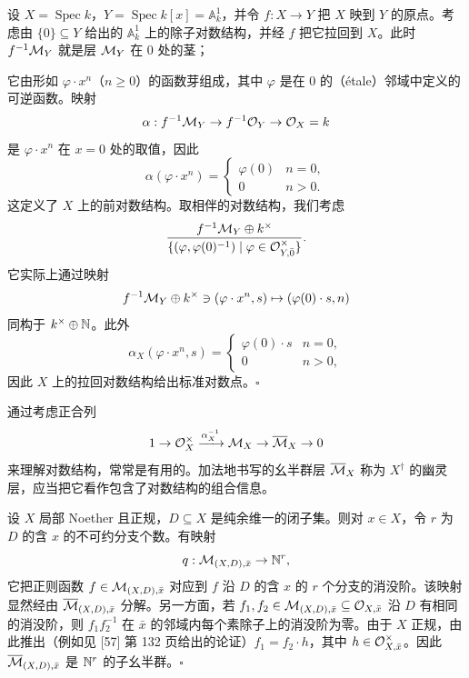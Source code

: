 \begin{example}
设 $X=\operatorname{Spec} k$，$Y=\operatorname{Spec} k[x]=\mathbb{A}^1_k$，并令 $f:X\to Y$ 把 $X$ 映到 $Y$ 的原点。考虑由 $\{0\}\subseteq Y$ 给出的 $\mathbb{A}^1_k$ 上的除子对数结构，并经 $f$ 把它拉回到 $X$。此时 $f^{-1}\mathcal{M}_Y$ 就是层 $\mathcal{M}_Y$ 在 $0$ 处的茎；

它由形如 $\varphi\cdot x^n$（$n\ge 0$）的函数芽组成，其中 $\varphi$ 是在 $0$ 的（étale）邻域中定义的可逆函数。映射
\[
  \alpha:f^{-1}\mathcal{M}_Y\to f^{-1}\mathcal{O}_Y\to\mathcal{O}_X=k
\]
是 $\varphi\cdot x^n$ 在 $x=0$ 处的取值，因此
\[
  \alpha(\varphi\cdot x^n)=
  \begin{cases}
    \varphi(0) & n=0,\\
    0 & n>0.
  \end{cases}
\]
这定义了 $X$ 上的前对数结构。取相伴的对数结构，我们考虑
\[
  \frac{f^{-1}\mathcal{M}_Y\oplus k^{\times}}{\{(\varphi,\varphi(0)^{-1})\mid \varphi\in\mathcal{O}_{Y,\bar 0}^{\times}\}}.
\]
它实际上通过映射
\[
  f^{-1}\mathcal{M}_Y\oplus k^{\times}\ni(\varphi\cdot x^n,s)\mapsto(\varphi(0)\cdot s,n)
\]
同构于 $k^{\times}\oplus\mathbb{N}$。此外
\[
  \alpha_X(\varphi\cdot x^n,s)=
  \begin{cases}
    \varphi(0)\cdot s & n=0,\\
    0 & n>0,
  \end{cases}
\]
因此 $X$ 上的拉回对数结构给出标准对数点。\hfill$\square$
\end{example}

通过考虑正合列
\[
  1\to\mathcal{O}_X^{\times}\xrightarrow{\alpha_X^{-1}}\mathcal{M}_X\to\overline{\mathcal{M}}_X\to 0
\]
来理解对数结构，常常是有用的。加法地书写的幺半群层 $\overline{\mathcal{M}}_X$ 称为 $X^\dagger$ 的幽灵层，应当把它看作包含了对数结构的组合信息。


\begin{example}
设 $X$ 局部 Noether 且正规，$D\subseteq X$ 是纯余维一的闭子集。则对 $x\in X$，令 $r$ 为 $D$ 的含 $x$ 的不可约分支个数。有映射
\[
  q:\mathcal{M}_{(X,D),\bar x}\to\mathbb{N}^r,
\]
它把正则函数 $f\in\mathcal{M}_{(X,D),\bar x}$ 对应到 $f$ 沿 $D$ 的含 $x$ 的 $r$ 个分支的消没阶。该映射显然经由 $\overline{\mathcal{M}}_{(X,D),\bar x}$ 分解。另一方面，若 $f_1,f_2\in\mathcal{M}_{(X,D),\bar x}\subseteq\mathcal{O}_{X,\bar x}$ 沿 $D$ 有相同的消没阶，则 $f_1f_2^{-1}$ 在 $\bar x$ 的邻域内每个素除子上的消没阶为零。由于 $X$ 正规，由此推出（例如见 [57] 第 132 页给出的论证）$f_1=f_2\cdot h$，其中 $h\in\mathcal{O}_{X,\bar x}^{\times}$。因此 $\overline{\mathcal{M}}_{(X,D),\bar x}$ 是 $\mathbb{N}^r$ 的子幺半群。\hfill$\square$
\end{example}

